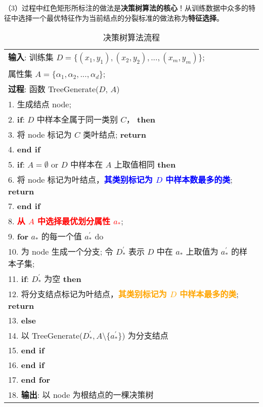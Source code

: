 （3）过程中红色矩形所标注的做法是\textbf{决策树算法的核心}！从训练数据中众多的特征中选择一个最优特征作为当前结点的分裂标准的做法称为\textbf{特征选择}。

\begin{table}[t]
	\caption{决策树算法流程}
	\begin{center}
		\begin{tabular}{p{15cm}}
			\hline
			\textbf{输入}: 训练集 $D = \{(x_1, y_1), (x_2, y_2), ..., (x_m, y_m)\}$; \\
			属性集 $A = \{\alpha_1, \alpha_2, ..., \alpha_d\}$; \\
			\hline
			\textbf{过程}: 函数 TreeGenerate($D$, $A$) \\
			1. 生成结点 node; \\
			2. \textbf{if}: $D$ 中样本全属于同一类别 $C$， \textbf{then} \\
			3. 将 node 标记为 $C$ 类叶结点; \textbf{return} \\
			4. \textbf{end if} \\
			5. \textbf{if}: $A = \emptyset$ or $D$ 中样本在 $A$ 上取值相同 \textbf{then} \\
			6. 将 node 标记为叶结点，\textbf{\textcolor{blue}{其类别标记为 $D$ 中样本数最多的类}}; \textbf{return} \\
			7. \textbf{end if} \\
			8. \textbf{\textcolor{red}{从 $A$ 中选择最优划分属性 $a_{*}$}}; \\
			9. \textbf{for} $a_{*}$ 的每一个值 $a_{*}^{'}$ do \\
			10. 为 node 生成一个分支; 令 $D_{*}^{'}$ 表示 $D$ 中在 $a_{*}$ 上取值为 $a_{*}^{'}$ 的样本子集; \\
			11. \textbf{if}: $D_{*}^{'}$ 为空 \textbf{then} \\
			12. 将分支结点标记为叶结点，\textbf{\textcolor{orange}{其类别标记为 $D$ 中样本最多的类}}; \textbf{return} \\
			13. \textbf{else} \\
			14. 以 TreeGenerate($D_{*}^{'}, A \setminus \{a_{*}^{'}\}$) 为分支结点 \\
			15. \textbf{end if} \\
			16. \textbf{end if} \\
			17. \textbf{end for} \\
			18. \textbf{输出}: 以 node 为根结点的一棵决策树 \\
			\hline
		\end{tabular}
	\end{center}
\end{table}

